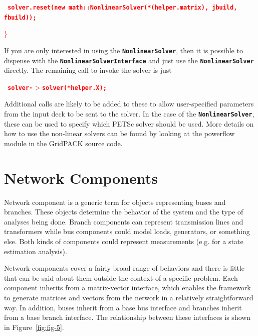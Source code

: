 \documentclass[12pt]{report} %
\begin{document}
\textcolor{red}{\texttt{\textbf{  solver.reset(new math::NonlinearSolver(*(helper.matrix), jbuild, fbuild));}}}

\textcolor{red}{\texttt{\textbf{$\boldsymbol{\mathrm{\}}}$}}}

If you are only interested in using the \texttt{\textbf{NonlinearSolver}}, then it is possible to dispense with the \texttt{\textbf{NonlinearSolverInterface}} and just use the \texttt{\textbf{NonlinearSolver}} directly. The remaining call to invoke the solver is just

\textcolor{red}{\texttt{\textbf{  solver-$\boldsymbol{\mathrm{>}}$solver(*helper.X);}}}

Additional calls are likely to be added to these to allow user-specified parameters from the input deck to be sent to the solver. In the case of the \texttt{\textbf{NonlinearSolver}}, these can be used to specify which PETSc solver should be used.
More details on how to use the non-linear solvers can be found by looking at the powerflow module in the GridPACK source code.

\section{Network Components}

Network component is a generic term for objects representing buses and branches. These objects determine the behavior of the system and the type of analyses being done. Branch components can represent transmission lines and transformers while bus components could model loads, generators, or something else. Both kinds of components could represent measurements (e.g. for a state estimation analysis). 

Network components cover a fairly broad range of behaviors and there is little that can be said about them outside the context of a specific problem. Each component inherits from a matrix-vector interface, which enables the framework to generate matrices and vectors from the network in a relatively straightforward way. In addition, buses inherit from a base bus interface and branches inherit from a base branch interface. The relationship between these interfaces is shown in Figure~\ref{fig:fig-5}.
\end{document}
